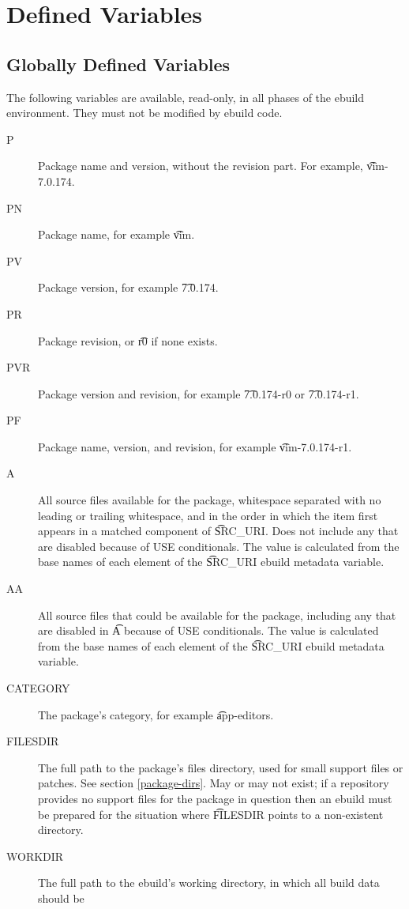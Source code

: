 \section{Defined Variables}
\label{ebuild-env-vars}

\subsection{Globally Defined Variables}
\label{global-ebuild-vars}

The following variables are available, read-only, in all phases of the ebuild environment. They
must not be modified by ebuild code.
\begin{description}
\item[P] Package name and version, without the revision part. For example, \t{vim-7.0.174}.
\item[PN] Package name, for example \t{vim}.
\item[PV] Package version, for example \t{7.0.174}.
\item[PR] Package revision, or \t{r0} if none exists.
\item[PVR] Package version and revision, for example \t{7.0.174-r0} or \t{7.0.174-r1}.
\item[PF] Package name, version, and revision, for example \t{vim-7.0.174-r1}.
\item[A] All source files available for the package, whitespace separated with no leading
    or trailing whitespace, and in the order in which the item first appears in a matched
    component of \t{SRC\_URI}\@. Does not include any that are disabled because
    of USE conditionals. The value is calculated from the base names of each element of the
    \t{SRC\_URI} ebuild metadata variable.
\item[AA] All source files that could be available for the package, including any that are disabled
    in \t{A} because of USE conditionals. The value is calculated from the base names of each element
    of the \t{SRC\_URI} ebuild metadata variable.
\item[CATEGORY] The package's category, for example \t{app-editors}.
\item[FILESDIR] The full path to the package's files directory, used for small support files or
    patches. See section \ref{package-dirs}. May or may not exist; if a repository provides no
    support files for the package in question then an ebuild must be prepared for the situation
    where \t{FILESDIR} points to a non-existent directory.
\item[WORKDIR] The full path to the ebuild's working directory, in which all build data should be

\end{description}
